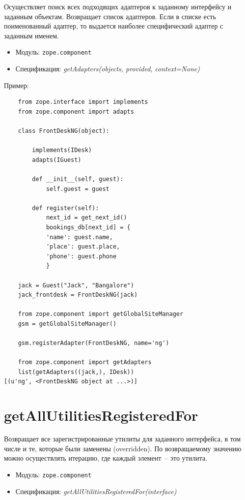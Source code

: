 \documentclass[a4paper,openany,twoside,final]{book}
\providecommand*{\DUroletitlereference}[1]{\textsl{#1}}
\begin{document}
Осуществляет поиск всех подходящих адаптеров к заданному интерфейсу и заданным объектам.  Возвращает список адаптеров.  Если в списке есть поименованный адаптер, то выдается наиболее специфический адаптер с заданным именем.

\begin{itemize}

\item Модуль: \texttt{zope.component}

\item Спецификация: \DUroletitlereference{getAdapters(objects, provided, context=None)}

\end{itemize}

Пример:

\begin{verbatim}
    from zope.interface import implements
    from zope.component import adapts

    class FrontDeskNG(object):

        implements(IDesk)
        adapts(IGuest)

        def __init__(self, guest):
            self.guest = guest

        def register(self):
            next_id = get_next_id()
            bookings_db[next_id] = {
            'name': guest.name,
            'place': guest.place,
            'phone': guest.phone
            }

    jack = Guest("Jack", "Bangalore")
    jack_frontdesk = FrontDeskNG(jack)

    from zope.component import getGlobalSiteManager
    gsm = getGlobalSiteManager()

    gsm.registerAdapter(FrontDeskNG, name='ng')

    from zope.component import getAdapters
    list(getAdapters((jack,), IDesk))
[(u'ng', <FrontDeskNG object at ...>)]
\end{verbatim}


\section*{getAllUtilitiesRegisteredFor%
  \label{getallutilitiesregisteredfor}%
}

Возвращает все зарегистрированные утилиты для заданного интерфейса, в том числе и те, которые были заменены (overridden).  По возвращаемому значению можно осуществлять итерацию, где каждый элемент~-- это утилита.

\begin{itemize}

\item Модуль: \texttt{zope.component}

\item Спецификация: \DUroletitlereference{getAllUtilitiesRegisteredFor(interface)}

\end{itemize}
\end{document}
